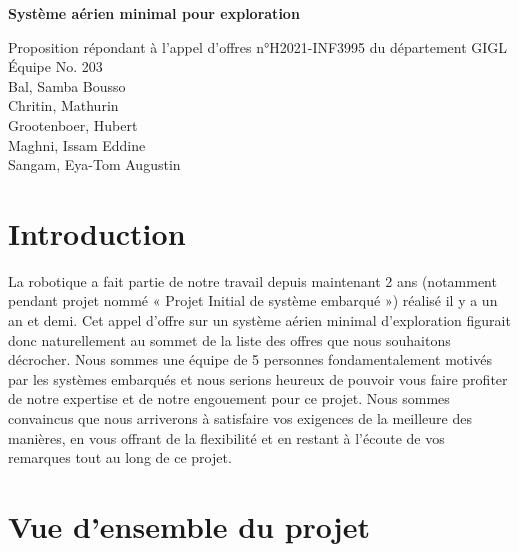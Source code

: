 \documentclass{mistcoursedoc}
\author{Équipe \equipe}
\newcommand{\equipe}{203}
\begin{document}
\maketitle
\vspace{2cm}
\begin{center}

  {\Huge\bf Système aérien minimal pour exploration\\[3em]}

  \Large Proposition répondant à l’appel d’offres  n°H2021-INF3995 du département GIGL\\[3em]


  Équipe No. \equipe\\[3em]

  Bal, Samba Bousso\\[1em]
  Chritin, Mathurin\\[1em]
  Grootenboer, Hubert\\[1em]
  Maghni, Issam Eddine\\[1em]
  Sangam, Eya-Tom Augustin\\[1em]

  \vfill

\end{center}

\newpage
{
  \renewcommand{\contentsname}{Table des matières}
  \hypersetup{hidelinks}
  \setcounter{secnumdepth}{3}
  \setcounter{tocdepth}{3}
  \tableofcontents
}
\newpage

\section*{Introduction}
La robotique a fait partie de notre travail depuis maintenant 2 ans (notamment pendant projet nommé « Projet Initial de système embarqué ») réalisé il y a un an et demi. Cet appel d'offre sur un système aérien minimal d'exploration figurait donc naturellement au sommet de la liste des offres que nous souhaitons décrocher. Nous sommes une équipe de 5 personnes fondamentalement motivés par les systèmes embarqués et nous serions heureux de pouvoir vous faire profiter de notre expertise et de notre engouement pour ce projet. Nous sommes convaincus que nous arriverons à satisfaire vos exigences de la meilleure des manières, en vous offrant de la flexibilité et en restant à l'écoute de vos remarques tout au long de ce projet.

\section{Vue d’ensemble du projet}
\end{document}
